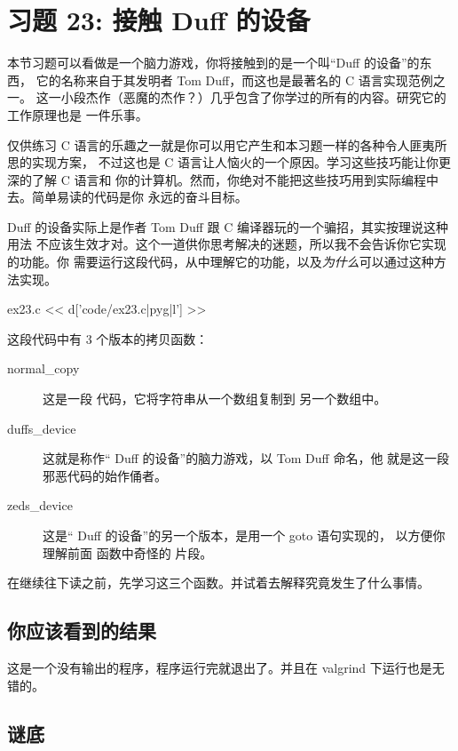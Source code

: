 ﻿\chapter{习题 23: 接触 Duff 的设备}

本节习题可以看做是一个脑力游戏，你将接触到的是一个叫“Duff 的设备”的东西，
它的名称来自于其发明者 Tom Duff，而这也是最著名的 C 语言实现范例之一。
这一小段杰作（恶魔的杰作？）几乎包含了你学过的所有的内容。研究它的工作原理也是
一件乐事。

\begin{aside}{仅供练习}
C 语言的乐趣之一就是你可以用它产生和本习题一样的各种令人匪夷所思的实现方案，
不过这也是 C 语言让人恼火的一个原因。学习这些技巧能让你更深的了解 C 语言和
你的计算机。然而，你绝对不能把这些技巧用到实际编程中去。简单易读的代码是你
永远的奋斗目标。
\end{aside}

Duff 的设备实际上是作者 Tom Duff 跟 C 编译器玩的一个骗招，其实按理说这种用法
不应该生效才对。这个一道供你思考解决的迷题，所以我不会告诉你它实现的功能。你
需要运行这段代码，从中理解它的功能，以及\emph{为什么}可以通过这种方法实现。

\begin{code}{ex23.c}
<< d['code/ex23.c|pyg|l'] >>
\end{code}

这段代码中有 3 个版本的拷贝函数：

\begin{description}
\item[normal\_copy] 这是一段  代码，它将字符串从一个数组复制到
    另一个数组中。
\item[duffs\_device] 这就是称作“ Duff 的设备”的脑力游戏，以 Tom Duff 命名，他
    就是这一段邪恶代码的始作俑者。
\item[zeds\_device] 这是“ Duff 的设备”的另一个版本，是用一个 goto 语句实现的，
    以方便你理解前面   函数中奇怪的  片段。
\end{description}

在继续往下读之前，先学习这三个函数。并试着去解释究竟发生了什么事情。

\section{你应该看到的结果}

这是一个没有输出的程序，程序运行完就退出了。并且在 valgrind 下运行也是无
错的。

\section{谜底}

